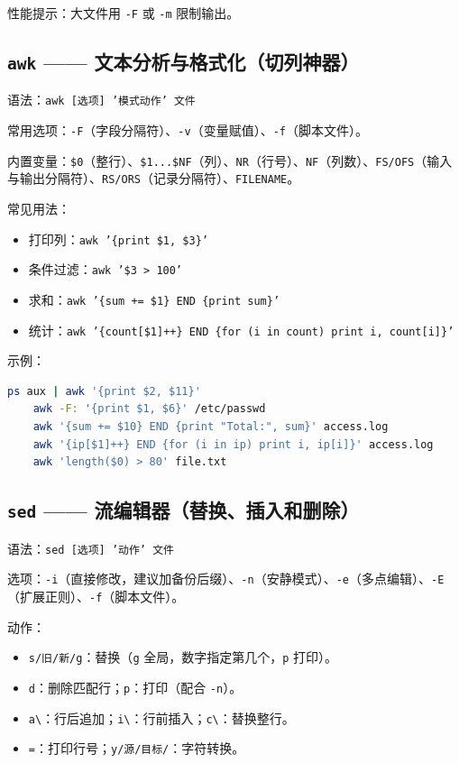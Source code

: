 性能提示：大文件用 \texttt{-F} 或 \texttt{-m} 限制输出。

\subsection*{\texttt{awk} —— 文本分析与格式化（切列神器）} 语法：\texttt{awk [选项] '模式{动作}' 文件}

常用选项：\texttt{-F}（字段分隔符）、\texttt{-v}（变量赋值）、\texttt{-f}（脚本文件）。

内置变量：\texttt{\$0}（整行）、\texttt{\$1...\$NF}（列）、\texttt{NR}（行号）、\texttt{NF}（列数）、\texttt{FS/OFS}（输入与输出分隔符）、\texttt{RS/ORS}（记录分隔符）、\texttt{FILENAME}。

常见用法：
\begin{itemize}
\item 打印列：\texttt{awk '\{print \$1, \$3\}'}
\item 条件过滤：\texttt{awk '\$3 > 100'}
\item 求和：\texttt{awk '\{sum += \$1\} END \{print sum\}'}
\item 统计：\texttt{awk '\{count[\$1]++\} END \{for (i in count) print i, count[i]\}'}
\end{itemize}

示例：
\begin{lstlisting}[language=bash]
	ps aux | awk '{print $2, $11}'
	awk -F: '{print $1, $6}' /etc/passwd
	awk '{sum += $10} END {print "Total:", sum}' access.log
	awk '{ip[$1]++} END {for (i in ip) print i, ip[i]}' access.log
	awk 'length($0) > 80' file.txt
\end{lstlisting}

\subsection*{\texttt{sed} —— 流编辑器（替换、插入和删除）}
语法：\texttt{sed [选项] '动作' 文件}

选项：\texttt{-i}（直接修改，建议加备份后缀）、\texttt{-n}（安静模式）、\texttt{-e}（多点编辑）、\texttt{-E}（扩展正则）、\texttt{-f}（脚本文件）。

动作：
\begin{itemize}
\item \texttt{s/旧/新/g}：替换（\texttt{g} 全局，数字指定第几个，\texttt{p} 打印）。
\item \texttt{d}：删除匹配行；\texttt{p}：打印（配合 \texttt{-n}）。
\item \texttt{a\textbackslash}：行后追加；\texttt{i\textbackslash}：行前插入；\texttt{c\textbackslash}：替换整行。
\item \texttt{=}：打印行号；\texttt{y/源/目标/}：字符转换。
\end{itemize}

